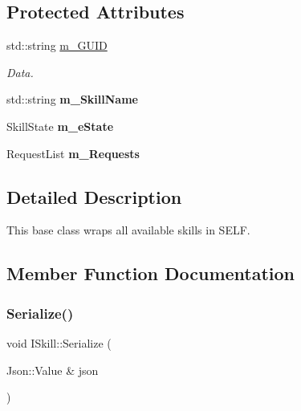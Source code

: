 \subsection*{Protected Attributes}
\begin{DoxyCompactItemize}
\item 
\mbox{\label{class_i_skill_a9ae6267977d36500e4d0cdfc1ea6747b}} 
std\+::string \hyperlink{class_i_skill_a9ae6267977d36500e4d0cdfc1ea6747b}{m\+\_\+\+G\+U\+ID}
\begin{DoxyCompactList}\small\item\em Data. \end{DoxyCompactList}\item 
\mbox{\label{class_i_skill_a649925e8b0559d7fe2a26bd390e2347e}} 
std\+::string {\bfseries m\+\_\+\+Skill\+Name}
\item 
\mbox{\label{class_i_skill_a8080ecead0803c22ba76a2661a840dd3}} 
Skill\+State {\bfseries m\+\_\+e\+State}
\item 
\mbox{\label{class_i_skill_a7ef2ff508b740d2f70b440b5d14d241d}} 
Request\+List {\bfseries m\+\_\+\+Requests}
\end{DoxyCompactItemize}


\subsection{Detailed Description}
This base class wraps all available skills in S\+E\+LF. 

\subsection{Member Function Documentation}
\mbox{\label{class_i_skill_a5a64f9e4fdb3a1b0aecd7e208cc534e2}} 
\subsubsection{\texorpdfstring{Serialize()}{Serialize()}}
{\footnotesize\ttfamily void I\+Skill\+::\+Serialize (\begin{DoxyParamCaption}\item[{Json\+::\+Value \&}]{json }\end{DoxyParamCaption})\hspace{0.3cm}{\ttfamily [virtual]}}



